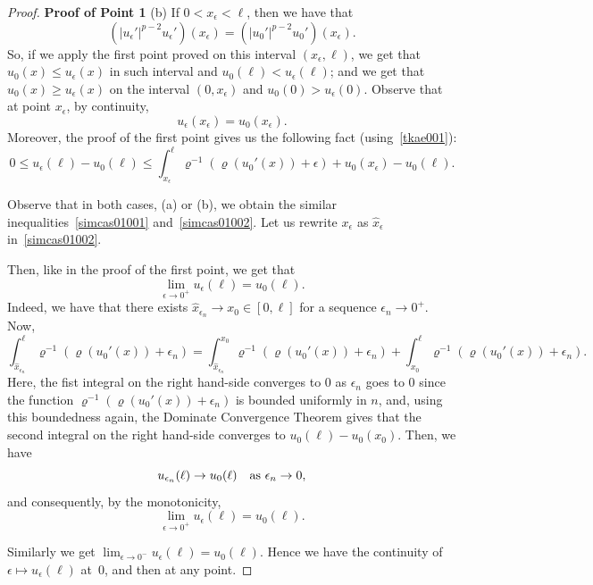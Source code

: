 \documentclass[10pt,a4paper]{amsart}
\begin{document}
\begin{proof}  {\bf Proof of Point 1}
\noindent (b) If 
  $0<x_\epsilon<\ell$, then we have that
$$(|u_\epsilon'|^{p-2}u_\epsilon')(x_\epsilon)=(|u_0'|^{p-2}u_0')(x_\epsilon).$$
So, if
we apply the first point proved on this interval $(x_\epsilon,\ell)$,  we get that $u_0(x)\le u_\epsilon(x)$ in such interval and $u_0(\ell)< u_\epsilon(\ell)$; and we get that $u_0(x)\ge u_\epsilon(x)$ on the interval $(0,x_\epsilon)$ and $u_0(0)> u_\epsilon(0)$.
Observe that at point $x_\epsilon$, by continuity,
\begin{equation}\label{tkae001} u_\epsilon(x_\epsilon)=u_0(x_\epsilon).
\end{equation}
 Moreover, the proof of  the first point gives us the following fact  (using~\eqref{tkae001}): 
\begin{equation}\label{simcas01002}0\le u_\epsilon(\ell)-u_0(\ell)\le \int_{x_\epsilon}^\ell\varrho^{-1}\left(\varrho(u_0'(x))+\epsilon\right)+u_0(x_\epsilon)-u_0(\ell).
\end{equation}


 Observe that in both cases, (a) or (b), we obtain the similar inequalities~\eqref{simcas01001} and~\eqref{simcas01002}. Let us rewrite $x_\epsilon$ as $\widehat x_\epsilon$ in~\eqref{simcas01002}.

Then, like in the proof of the first point,  we get that
$$\lim_{\epsilon\to 0^+}u_\epsilon(\ell)=u_0(\ell).$$
 Indeed, we have that there exists $\widehat x_{\epsilon_n}\to x_0\in[0,\ell]$ for a sequence $\epsilon_n\to 0^+$. 
 Now,
$$
\int_{\widehat x_{\epsilon_n}}^\ell\varrho^{-1}\left(\varrho(u_0'(x))+\epsilon_n\right)=\int_{\widehat x_{\epsilon_n}}^{x_0}\varrho^{-1}\left(\varrho(u_0'(x))+\epsilon_n\right)+\int_{x_0}^\ell\varrho^{-1}\left(\varrho(u_0'(x))+\epsilon_n\right).
$$
Here, the fist integral on the right hand-side converges to $0$ as $\epsilon_n$ goes to $0$ since  the function $\varrho^{-1}\left(\varrho(u_0'(x))+\epsilon_n\right)$ is bounded uniformly in $n$, and, using this boundedness again,  the Dominate Convergence Theorem gives that the second integral on the right hand-side converges to $u_0(\ell)-u_0(x_0)$.  Then, we have
$$u_{\epsilon_n}(\ell)\to u_0(\ell)\quad\hbox{as }\epsilon_n\to 0,$$ 
and consequently, by the monotonicity,
$$\lim_{\epsilon\to 0^+}u_\epsilon(\ell)=u_0(\ell).$$


Similarly we get $\lim_{\epsilon\to 0^-}u_\epsilon(\ell)=u_0(\ell).$ 
Hence we have the  continuity of $\epsilon\mapsto u_\epsilon(\ell)$  at~$0$, and then at any point.
\end{proof}
\end{document}

